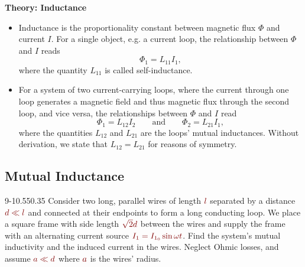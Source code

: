 \documentclass[11pt, a4paper]{article}
\newcommand{\eqtext}[1]{\qquad \text{#1} \qquad}
\newcommand{\dmath}[1]{\textcolor{Maroon}{#1}}  %
\newcommand{\defaultQuestionWidth}{0.55}
\begin{document}
\textbf{Theory: Inductance}
\begin{itemize}
	\item Inductance is the proportionality constant between magnetic flux $ \Phi $ and current $ I $. For a single object, e.g. a current loop, the relationship between $ \Phi $ and $ I $ reads
	\begin{equation*}
		\Phi_{1} = L_{11} I_{1},
	\end{equation*}
	where the quantity $ L_{11} $ is called self-inductance. 
	
	\item For a system of two current-carrying loops, where the current through one loop generates a magnetic field and thus magnetic flux through the second loop, and vice versa, the relationships between $ \Phi $ and $ I $ read
	\begin{equation*}
		\Phi_{1} = L_{12}I_{2} \eqtext{and}  \Phi_{2} = L_{21}I_{1},
	\end{equation*}
	where the quantities $ L_{12} $ and $ L_{21} $ are the loops' mutual inductances. Without derivation, we state that $ L_{12} = L_{21} $ for reasons of symmetry.
	
\end{itemize}





\subsection{Mutual Inductance}
\begin{figurequestion}{9-1}{\defaultQuestionWidth}{0.35}
Consider two long, parallel wires of length $ \dmath{l} $ separated by a distance $ \dmath{d \ll l} $ and connected at their endpoints to form a long conducting loop. We place a square frame with side length $ \dmath{\sqrt{2}d} $ between the wires and supply the frame with an alternating current source $ \dmath{I_{1} = I_{1_{0}}\sin \omega t} $. Find the system's mutual inductivity and the induced current in the wires. Neglect Ohmic losses, and assume $ \dmath{a \ll d} $ where $ \dmath{a} $ is the wires' radius.
\end{figurequestion}
\end{document}
